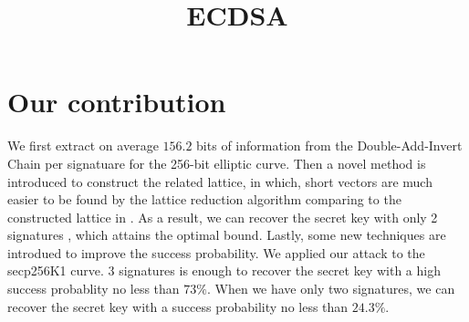 \documentclass[sigconf]{acmart}
\begin{document}
\title{ECDSA}









\maketitle

\section{Our contribution}

We first extract on average $156.2$ bits of information from the Double-Add-Invert Chain per signatuare for the 256-bit elliptic curve. Then a novel method is introduced to construct the related lattice, in which, short vectors are  much easier to be found by the lattice reduction algorithm comparing to the constructed lattice in \cite{FWC16}. As a result, we can recover the secret key with only 2 signatures , which attains the optimal bound. Lastly, some new techniques are introdued to improve the success probability.
We applied our attack to the secp256K1 curve. 3 signatures is enough to recover the secret key with a high success probablity no less than $73\%$. When we have only two signatures, we can recover the secret key with a success probability no less than $24.3\%$.
\end{document}
